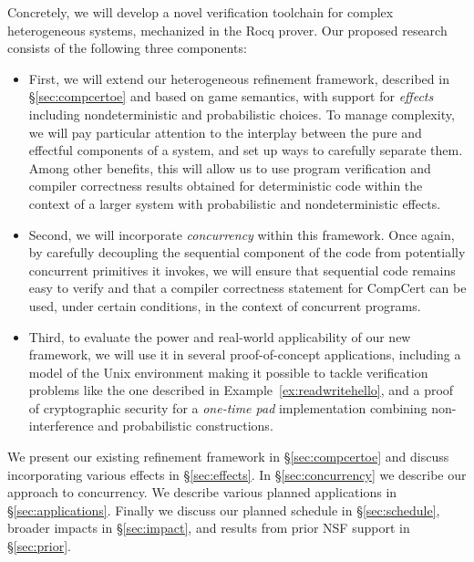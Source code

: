 Concretely,
we will develop a novel
verification toolchain for complex heterogeneous systems,
mechanized in the Rocq prover.
Our proposed research consists of the following three components:
\begin{itemize} \itemsep 0pt
\item First, we will extend our heterogeneous refinement framework,
  described in \S\ref{sec:compcertoe} and based on game semantics,
  with support for \emph{effects}
  including nondeterministic and probabilistic choices.
  To manage complexity,
  we will pay particular attention to the interplay between
  the pure and effectful components of a system,
  and set up ways to carefully separate them.
  Among other benefits,
  this will allow us to use program verification
  and compiler correctness results
  obtained for deterministic code
  within the context of a larger system
  with probabilistic and nondeterministic effects.
\item Second,
  we will incorporate \emph{concurrency} within this framework.
  Once again,
  by carefully decoupling the sequential component of the code from
  potentially concurrent primitives it invokes,
  we will ensure that sequential code remains easy to verify
  and that a compiler correctness statement for CompCert
  can be used, under certain conditions,
  in the context of concurrent programs.
\item Third, to evaluate the power and real-world applicability of
  our new framework, we will use it in several proof-of-concept applications,
  including a model of the Unix environment
  making it possible to tackle verification problems
  like the one described in Example~\ref{ex:readwritehello},
  and a proof of cryptographic security for a \emph{one-time pad} implementation
  combining non-interference and probabilistic constructions.
\end{itemize}
We present our existing refinement framework in \S\ref{sec:compcertoe}
and discuss incorporating various effects in \S\ref{sec:effects}.
In \S\ref{sec:concurrency} we describe our approach to concurrency.
We describe various planned applications in \S\ref{sec:applications}.
Finally we discuss
our planned schedule in \S\ref{sec:schedule},
broader impacts in \S\ref{sec:impact}, and
results from prior NSF support in \S\ref{sec:prior}.

